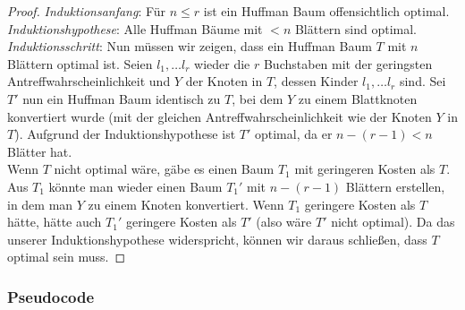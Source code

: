 \documentclass[a4paper,10pt,ngerman]{scrartcl}
\begin{document}
    \begin{proof}
        \textit{Induktionsanfang}:
        Für $n \le r$ ist ein Huffman Baum offensichtlich optimal. \\
        \textit{Induktionshypothese}: Alle Huffman Bäume mit $< n$ Blättern sind optimal. \\
        \textit{Induktionsschritt}: Nun müssen wir zeigen, dass ein Huffman Baum $T$ mit $n$ Blättern optimal ist.
        Seien $l_1, \dots l_r$ wieder die $r$ Buchstaben mit der geringsten Antreffwahrscheinlichkeit und $Y$ der Knoten in $T$, dessen Kinder $l_1, \dots l_r$ sind.
        Sei $T'$ nun ein Huffman Baum identisch zu $T$, bei dem $Y$ zu einem Blattknoten konvertiert wurde (mit der gleichen Antreffwahrscheinlichkeit wie der Knoten $Y$ in $T$).
        Aufgrund der Induktionshypothese ist $T'$ optimal, da er $n - (r - 1) < n$ Blätter hat.\\
        Wenn $T$ nicht optimal wäre, gäbe es einen Baum $T_1$ mit geringeren Kosten als $T$. Aus $T_1$ könnte man wieder einen Baum $T_1'$ mit $n - (r - 1)$ Blättern erstellen, in dem man $Y$ zu einem Knoten konvertiert. Wenn $T_1$ geringere Kosten als $T$ hätte, hätte auch $T_1'$ geringere Kosten als $T'$ (also wäre $T'$ nicht optimal).
        Da das unserer Induktionshypothese widerspricht, können wir daraus schließen, dass $T$ optimal sein muss.
    \end{proof}

    \subsubsection{Pseudocode}
\end{document}
